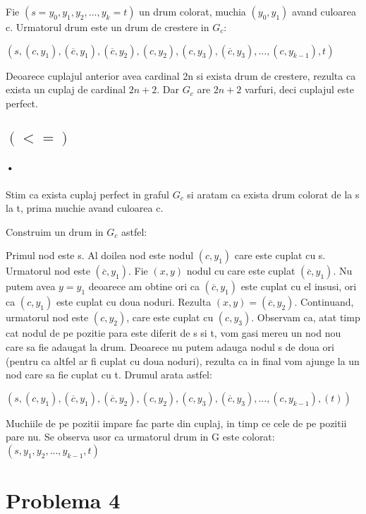 \documentclass[paper=a4, fontsize=11pt]{scrartcl}
\begin{document}
Fie $(s=y_0, y_1, y_2, ..., y_k=t)$ un drum colorat, muchia $(y_0, y_1)$ avand culoarea c. Urmatorul drum este un drum de crestere in $G_c$:

\begin{center}
$(s, (c, y_1), (\overline{c}, y_1), (\overline{c}, y_2), (c, y_2), (c, y_3), (\overline{c}, y_3), ..., (c, y_{k-1}), t)$
\end{center}

Deoarece cuplajul anterior avea cardinal 2n si exista drum de crestere, rezulta ca exista un cuplaj de cardinal $2n+2$. Dar $G_c$ are $2n+2$ varfuri, deci cuplajul este perfect.

\subsection{$(<=)$}
\paragraph{•}
Stim ca exista cuplaj perfect in graful $G_c$ si aratam ca exista drum colorat de la s la t, prima muchie avand culoarea c.

Construim un drum in $G_c$ astfel:

Primul nod este s. Al doilea nod este nodul $(c, y_1)$ care este cuplat cu s. Urmatorul nod este $(\overline{c}, y_1)$. Fie $(x, y)$ nodul cu care este cuplat $(\overline{c}, y_1)$. Nu putem avea $y=y_1$ deoarece am obtine ori ca $(\overline{c}, y_1)$ este cuplat cu el insusi, ori ca $(c, y_1)$ este cuplat cu doua noduri. Rezulta $(x, y)=(\overline{c}, y_2)$. Continuand, urmatorul nod este $(c, y_2)$, care este cuplat cu $(c, y_3)$. Observam ca, atat timp cat nodul de pe pozitie para este diferit de s si t, vom gasi mereu un nod nou care sa fie adaugat la drum. Deoarece nu putem adauga nodul s de doua ori (pentru ca altfel ar fi cuplat cu doua noduri), rezulta ca in final vom ajunge la un nod care sa fie cuplat cu t. Drumul arata astfel:

\begin{center}
$(s, (c, y_1), (\overline{c}, y_1), (\overline{c}, y_2), (c, y_2), (c, y_3), (\overline{c}, y_3), ..., (c, y_{k-1}), (t))$
\end{center}

Muchiile de pe pozitii impare fac parte din cuplaj, in timp ce cele de pe pozitii pare nu. Se observa usor ca urmatorul drum in G este colorat: $(s, y_1, y_2, ..., y_{k-1}, t)$

\newpage
\section{Problema 4}
\end{document}
